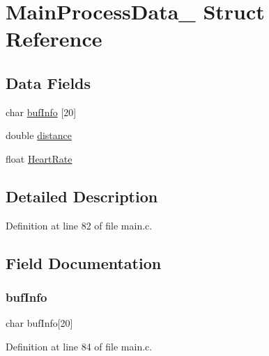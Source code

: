 \hypertarget{struct_main_process_data__}{}\section{Main\+Process\+Data\+\_\+ Struct Reference}
\label{struct_main_process_data__}
\subsection*{Data Fields}
\begin{DoxyCompactItemize}
\item 
char \mbox{\hyperlink{struct_main_process_data___ae9a120d1fe4b71425af49710ed6c7a03}{buf\+Info}} \mbox{[}20\mbox{]}
\item 
double \mbox{\hyperlink{struct_main_process_data___a79b8e036dca6911e3295a47d99f21f43}{distance}}
\item 
float \mbox{\hyperlink{struct_main_process_data___a19546b530c18a3d4bba8eafbb4778f69}{Heart\+Rate}}
\end{DoxyCompactItemize}


\subsection{Detailed Description}


Definition at line 82 of file main.\+c.



\subsection{Field Documentation}
\mbox{\label{struct_main_process_data___ae9a120d1fe4b71425af49710ed6c7a03}} 
\subsubsection{\texorpdfstring{buf\+Info}{bufInfo}}
{\footnotesize\ttfamily char buf\+Info\mbox{[}20\mbox{]}}



Definition at line 84 of file main.\+c.

\mbox{\label{struct_main_process_data___a79b8e036dca6911e3295a47d99f21f43}} 
